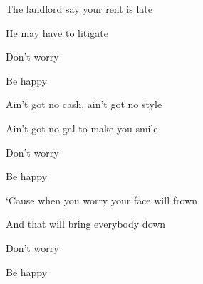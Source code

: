 \begin{song}
\bigskip

The landlord say your rent is late \par
{} He may have to litigate \par
Don't worry \par
Be happy \par

\bigskip

\Chorus

\bigskip

 Ain't got no cash, ain't got no style \par
{}Ain't got no gal to make you smile \par
Don't worry \par
Be happy \par

\bigskip

‘Cause when you worry your face will frown \par
And that will bring everybody down \par
Don't worry \par
Be happy  \par

\bigskip

\Chorus

\end{song}
